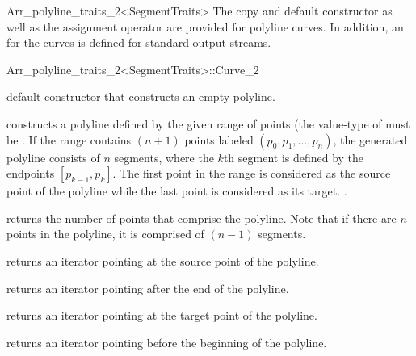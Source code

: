 \begin{ccRefClass}{Arr_polyline_traits_2<SegmentTraits>}
The copy and default constructor as well as 
the assignment operator are provided for polyline curves. In addition, 
an  for the curves is defined for standard output streams.

\begin{ccClass}{Arr_polyline_traits_2<SegmentTraits>::Curve_2}

\ccTypes



\ccCreation
{}

  {default constructor that constructs an empty polyline.}

  {constructs a polyline defined by the given range of points
   \ccc{[first, last)} (the value-type of  must be
   .
   If the range contains $(n + 1)$ points labeled $(p_{0},p_{1},\ldots,p_{n})$,
   the generated polyline consists of $n$ segments, where the $k$th segment 
   is defined by the endpoints $[p_{k-1},p_{k}]$. The first point in the 
   range is considered as the source point of the polyline while the last 
   point is considered as its target.
   .}

\ccAccessFunctions

  {returns the number of points that comprise the polyline.
   Note that if there are $n$ points in the polyline, it is comprised
   of $(n - 1)$ segments.}

  {returns an iterator pointing at the source point of the polyline.}

  {returns an iterator pointing after the end of the polyline.}

  {returns an iterator pointing at the target point of the polyline.}

  {returns an iterator pointing before the beginning of the polyline.}


\end{ccClass}
\end{ccRefClass}

